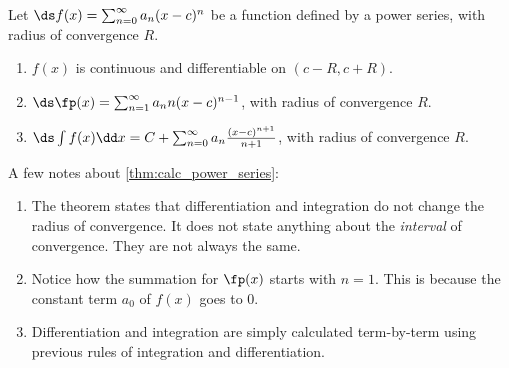 \begin{theorem}\label{thm:calc_power_series}
Let $\ds f(x) = \sum_{n=0}^\infty a_n(x-c)^n$ be a function defined by a power series, with radius of convergence $R$.
\begin{enumerate}
	\item $f(x)$ is continuous and differentiable on $(c-R,c+R)$.
	\item	$\ds \fp(x) = \sum_{n=1}^\infty a_nn(x-c)^{n-1}$, with radius of convergence $R$.
	\item	$\ds \int f(x)\dd x = C+\sum_{n=0}^\infty a_n\frac{(x-c)^{n+1}}{n+1}$, with radius of convergence $R$.
\end{enumerate}
\end{theorem}

A few notes about \autoref{thm:calc_power_series}:
\begin{enumerate}
	\item The theorem states that differentiation and integration do not change the radius of convergence. It does not state anything about the \emph{interval} of convergence. They are not always the same.
	\item	Notice how the summation for $\fp(x)$ starts with $n=1$. This is because the constant term $a_0$ of $f(x)$ goes to 0.
	\item	Differentiation and integration are simply calculated term-by-term using previous rules of integration and differentiation.
\end{enumerate}

